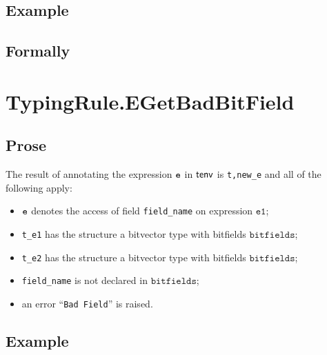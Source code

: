 \documentclass{book}
\newcommand\veone[0]{\texttt{e1}}
\newcommand\bitfields[0]{\texttt{bitfields}}
\begin{document}
  \subsection{Example}



\begin{emptyformal}
    \subsection{Formally}

\end{emptyformal}


\section{TypingRule.EGetBadBitField \label{sec:TypingRule.EGetBadBitField}}

  \subsection{Prose}
  The result of annotating the expression $\texttt{e}$ in $\textsf{tenv}$ is
\texttt{t,new\_e} and all of the following apply:
  \begin{itemize}
  \item $\texttt{e}$ denotes the access of field \texttt{field\_name} on expression $\veone$;
  \item \texttt{t\_e1} has the structure a bitvector type with bitfields $\bitfields$;
  \item \texttt{t\_e2} has the structure a bitvector type with bitfields $\bitfields$;
  \item \texttt{field\_name} is not declared in $\bitfields$;
  \item an error ``\texttt{Bad Field}'' is raised.
  \end{itemize}

  \subsection{Example}


\end{document}
